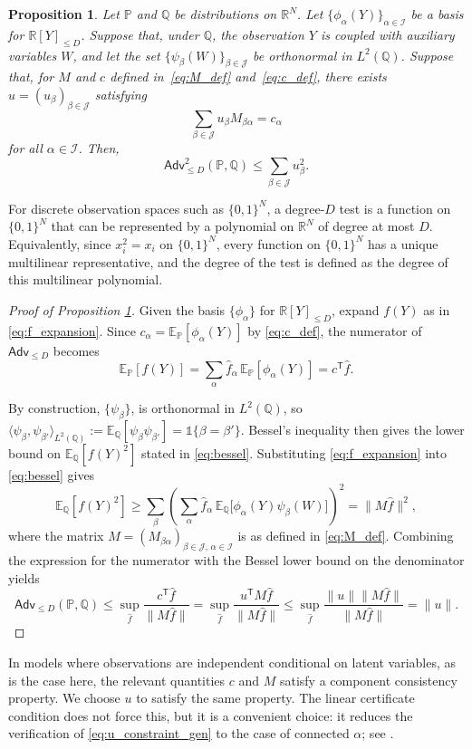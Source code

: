 \documentclass[11pt, letterpaper]{article}
\newtheorem{proposition}[theorem]{Proposition}
\numberwithin{equation}{section}
\newcommand{\Adv}{\mathsf{Adv}}
\newcommand{\cJ}{\mathcal{J}}
\newcommand{\cI}{\mathcal{I}}
\newcommand{\E}{\mathbb{E}}
\newcommand{\PP}{\mathbb{P}}
\newcommand{\QQ}{\mathbb{Q}}
\newcommand{\R}{\mathbb{R}}
\begin{document}
\begin{proposition}\label{prop:adv_bound_general}Let $\PP$ and $\QQ$ be distributions on $\R^N$. Let $\{\phi_\alpha(Y)\}_{\alpha\in\mathcal{I}}$ be a basis for $\mathbb R[Y]_{\le D}$.  Suppose that, under $\QQ$, the observation $Y$ is coupled with auxiliary variables $W$, and let the set $\{\psi_\beta(W)\}_{\beta\in\mathcal J}$ be orthonormal in $L^2(\QQ)$. Suppose that, for $M$ and $c$ defined in~\eqref{eq:M_def} and~\eqref{eq:c_def}, there exists $u=(u_\beta)_{\beta\in\mathcal J}$ satisfying  
\begin{equation}\label{eq:u_constraint_gen}
\sum_{\beta \in \cJ} u_\beta M_{\beta \alpha} = c_\alpha
\end{equation}
for all $\alpha \in \cI$.
Then, $$\Adv_{\leq D}^2(\PP,\QQ) \leq \sum_{\beta \in \cJ} u_\beta^2.$$
\end{proposition}
For discrete observation spaces such as $\{0,1\}^N$, a degree-$D$ test is a function on $\{0,1\}^N$ that can be represented by a polynomial on $\mathbb R^N$ of degree at most $D$. Equivalently, since $x_i^2=x_i$ on $\{0,1\}^N$, every function on $\{0,1\}^N$ has a unique multilinear representative, and the degree of the test is defined as the degree of this multilinear polynomial.
\begin{proof}[Proof of Proposition \ref{prop:adv_bound_general}]
 Given the basis $\{\phi_{\alpha}\}$ for $\mathbb R[Y]_{\leq D}$, expand $f(Y)$ as in \eqref{eq:f_expansion}.
Since \(c_\alpha = \E_\PP[\phi_\alpha(Y)]\) by \eqref{eq:c_def}, the numerator of $\Adv_{\leq D}$ becomes
\[
    \E_{\PP}[f(Y)]
    = \sum_{\alpha} \hat{f}_{\alpha} \,  \E_{\PP}[\phi_{\alpha}(Y)]
    = c^{\mathsf{T}} \hat{f}.
\]

By construction, $\{\psi_\beta\}$, is orthonormal in $L^2(\QQ)$, so $\langle \psi_\beta,\psi_{\beta'}\rangle_{L^2(\QQ)}
:=\E_\QQ[\psi_\beta\psi_{\beta'}]
=\mathds 1\{\beta=\beta'\}.$
Bessel's inequality then gives the lower bound on $\E_\QQ[f(Y)^2]$ stated in
\eqref{eq:bessel}. Substituting \eqref{eq:f_expansion} into \eqref{eq:bessel} gives
\[
    \E_{\QQ}[f(Y)^{2}] 
     \geq 
    \sum_{\beta} \left( \sum_{\alpha} \hat{f}_{\alpha} \, \E_{\QQ}\big[ \phi_{\alpha}(Y) \psi_{\beta}(W) \big] \right)^{2}
    = \| M \hat{f} \|^{2},
\]
where the matrix $M = (M_{\beta \alpha})_{\beta \in \mathcal{J}, \, \alpha \in \mathcal{I}}$ is as defined in \eqref{eq:M_def}.
%
Combining the expression for the numerator with the Bessel lower bound on the denominator yields
\[
    \Adv_{\leq D}(\PP,\QQ)
     \leq
    \sup_{\hat{f}} \frac{c^{\mathsf{T}} \hat{f}}{\|M \hat{f}\|}
    =\sup_{\hat{f}} \frac{u^{\mathsf{T}} M \hat{f}}{\|M \hat{f}\|}
     \leq 
    \sup_{\hat{f}} \frac{\|u\|  \|M \hat{f}\|}{\|M \hat{f}\|}
    = \|u\|.\] \qedhere
\end{proof}
In models where observations are independent conditional on latent variables, as is the case here, the relevant quantities $c$ and $M$ satisfy a component consistency
property. We choose $u$ to satisfy the same property. The linear certificate condition does not force this, but it is a convenient choice: it reduces the verification of
\eqref{eq:u_constraint_gen} to the case of connected $\alpha$; see .
\end{document}
